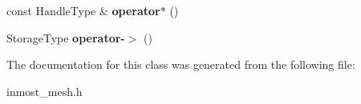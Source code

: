 \begin{DoxyCompactItemize}
\item 
\hypertarget{classINMOST_1_1ElementArray_1_1const__iterator_a9de46f6fd60eea5b0fee47b0a94e2e0c}{const Handle\-Type \& {\bfseries operator$\ast$} ()}\label{classINMOST_1_1ElementArray_1_1const__iterator_a9de46f6fd60eea5b0fee47b0a94e2e0c}

\item 
\hypertarget{classINMOST_1_1ElementArray_1_1const__iterator_a8e97fc3b963c256fd1bf27ce72bf08c3}{Storage\-Type {\bfseries operator-\/$>$} ()}\label{classINMOST_1_1ElementArray_1_1const__iterator_a8e97fc3b963c256fd1bf27ce72bf08c3}

\end{DoxyCompactItemize}


The documentation for this class was generated from the following file\-:\begin{DoxyCompactItemize}
\item 
inmost\-\_\-mesh.\-h\end{DoxyCompactItemize}
